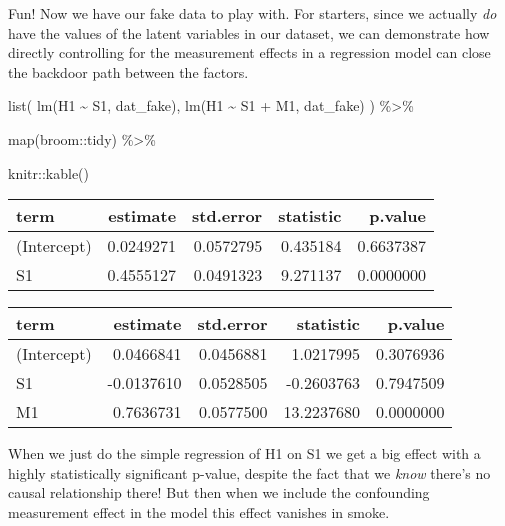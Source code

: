 \documentclass[
  letterpaper,
  DIV=11,
  numbers=noendperiod]{scrreprt}
\newenvironment{Shaded}{\begin{snugshade}}{\end{snugshade}}
\newcommand{\FunctionTok}[1]{\textcolor[rgb]{0.28,0.35,0.67}{#1}}
\newcommand{\NormalTok}[1]{\textcolor[rgb]{0.00,0.23,0.31}{#1}}
\newcommand{\SpecialCharTok}[1]{\textcolor[rgb]{0.37,0.37,0.37}{#1}}
\begin{document}
Fun! Now we have our fake data to play with. For starters, since we
actually \emph{do} have the values of the latent variables in our
dataset, we can demonstrate how directly controlling for the measurement
effects in a regression model can close the backdoor path between the
factors.

\begin{Shaded}
\begin{Highlighting}[]
\FunctionTok{list}\NormalTok{(}
  \FunctionTok{lm}\NormalTok{(H1 }\SpecialCharTok{\textasciitilde{}}\NormalTok{ S1, dat\_fake), }
  \FunctionTok{lm}\NormalTok{(H1 }\SpecialCharTok{\textasciitilde{}}\NormalTok{ S1 }\SpecialCharTok{+}\NormalTok{ M1, dat\_fake)}
\NormalTok{) }\SpecialCharTok{\%\textgreater{}\%} 
  
  \FunctionTok{map}\NormalTok{(broom}\SpecialCharTok{::}\NormalTok{tidy) }\SpecialCharTok{\%\textgreater{}\%} 
  
\NormalTok{  knitr}\SpecialCharTok{::}\FunctionTok{kable}\NormalTok{()}
\end{Highlighting}
\end{Shaded}

\begin{table}

\centering
\begin{tabular}[t]{l|r|r|r|r}
\hline
term & estimate & std.error & statistic & p.value\\
\hline
(Intercept) & 0.0249271 & 0.0572795 & 0.435184 & 0.6637387\\
\hline
S1 & 0.4555127 & 0.0491323 & 9.271137 & 0.0000000\\
\hline
\end{tabular}
\centering
\begin{tabular}[t]{l|r|r|r|r}
\hline
term & estimate & std.error & statistic & p.value\\
\hline
(Intercept) & 0.0466841 & 0.0456881 & 1.0217995 & 0.3076936\\
\hline
S1 & -0.0137610 & 0.0528505 & -0.2603763 & 0.7947509\\
\hline
M1 & 0.7636731 & 0.0577500 & 13.2237680 & 0.0000000\\
\hline
\end{tabular}
\end{table}

When we just do the simple regression of H1 on S1 we get a big effect
with a highly statistically significant p-value, despite the fact that
we \emph{know} there's no causal relationship there! But then when we
include the confounding measurement effect in the model this effect
vanishes in smoke.
\end{document}
